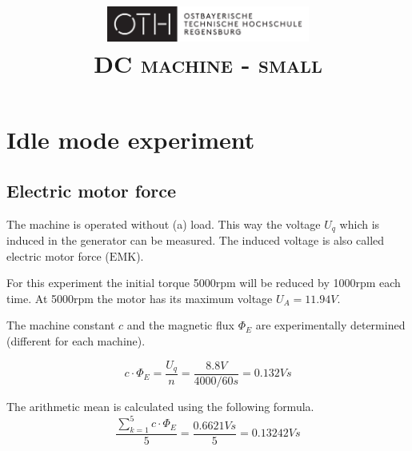 \documentclass[conference]{IEEEtran}
\author{
    \IEEEauthorblockN{
        \textsc{Ayham Alhalaibi}
    }
    \and
    \IEEEauthorblockN{
        \textsc{Julia Blechle}
    }
    \and
    \IEEEauthorblockN{
        \textsc{Clara Huber}
    }
}
\begin{document}
\title{
    \centering
    \includegraphics[width=0.5\textwidth]{../OTHR_OTHR_Logo.pdf}\\
    \textsc{DC machine - small} \\
}

\maketitle

\begin{abstract}

\end{abstract}

\section{Idle mode experiment}
\subsection{Electric motor force}

The machine is operated without (a) load. This way the voltage $U_q$ which is
induced in the generator can be measured. The induced voltage is also called
electric motor force ($\mathrm{EMK}$).

For this experiment the initial torque 5000rpm will be reduced by 1000rpm each
time. At 5000rpm the motor has its maximum voltage $U_A = 11.94V$.

The machine constant $c$ and the magnetic flux $\Phi_E$ are experimentally
determined (different for each machine).

\begin{equation} \label{eq:machine_const}
    c \cdot \Phi_E = \frac{U_q}{n} = \frac{8.8\si{V}}{4000/60\si{s}} = 0.132\si{Vs}
\end{equation}

The arithmetic mean is calculated using the following formula.\\
\begin{equation}
    \frac{ \sum\limits_{k = 1}^{5} c \cdot \Phi_E}{5} = \frac{0.6621Vs}{5} = 0.13242Vs
\end{equation}



\end{document}
